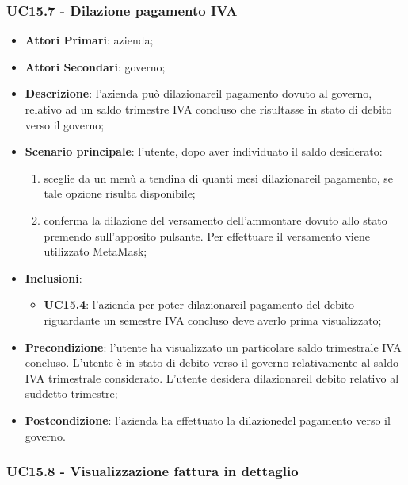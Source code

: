\subsubsection{UC15.7 - Dilazione pagamento IVA}
\begin{itemize}
	\item \textbf{Attori Primari}: azienda;
	\item \textbf{Attori Secondari}: governo;
	\item \textbf{Descrizione}: l'azienda può dilazionare\glosp il pagamento dovuto al governo, relativo ad un saldo trimestre IVA concluso che risultasse in stato di debito verso il governo;
	\item \textbf{Scenario principale}: l'utente, dopo aver individuato il saldo desiderato:
	\begin{enumerate}[label=\alph*.]
		\item sceglie da un menù a tendina di quanti mesi dilazionare\glosp il pagamento, se tale opzione risulta disponibile;
		\item conferma la dilazione del versamento dell'ammontare dovuto allo stato premendo sull'apposito pulsante. Per effettuare il versamento viene utilizzato MetaMask\glo;
	\end{enumerate}
	 
	\item \textbf{Inclusioni}:
	\begin{itemize}
		\item \textbf{UC15.4}: l'azienda per poter dilazionare\glosp il pagamento del debito riguardante un semestre IVA concluso deve averlo prima visualizzato;
	\end{itemize}
	\item \textbf{Precondizione}: l'utente ha visualizzato un particolare saldo trimestrale IVA concluso. L'utente è in stato di debito verso il governo relativamente al saldo IVA trimestrale considerato. L'utente desidera dilazionare\glosp il debito relativo al suddetto trimestre; 
	\item \textbf{Postcondizione}: l'azienda ha effettuato la dilazione\glosp del pagamento verso il governo.
\end{itemize} 

\subsubsection{UC15.8 - Visualizzazione fattura in dettaglio}

